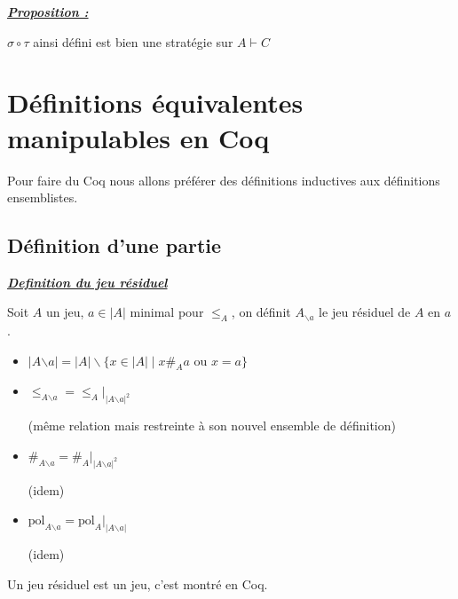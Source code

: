 \documentclass[a4paper,12ptCOUCOU
]{article}
\newlength{\mydepth}
\newlength{\myheight}
\newenvironment{answer}
{\par\begin{lrbox}{\mybox}\quad\begin{minipage}{\linewidth}\color{black}\setlength{\parskip}{10pt plus 1pt minus 1pt}\vspace*{-.7\baselineskip}}
{\end{minipage}\end{lrbox}
\settodepth{\mydepth}{\usebox{\mybox}}
\settoheight{\myheight}{\usebox{\mybox}}
\addtolength{\myheight}{\mydepth}
\noindent\makebox[0pt]{
  \color{gray}\hspace{-0pt}\rule[-\mydepth]{1pt}{\myheight}}
\usebox{\mybox}
  }
\begin{document}
\vspace{0.4cm}\begin{minipage}{\linewidth}\textbf{\textit{\underline{ Proposition : }}} \begin{answer}
$\sigma \circ \tau$ ainsi défini est bien une stratégie sur $A \vdash C$
\end{answer}\end{minipage}
\newpage
\section{Définitions équivalentes manipulables en Coq}

Pour faire du Coq nous allons préférer des définitions inductives aux
définitions ensemblistes.

\subsection{Définition d'une partie}

\vspace{0.4cm}\begin{minipage}{\linewidth}\textbf{\textit{\underline{ Definition du jeu résiduel }}} \begin{answer}
Soit $A$ un jeu, $a \in |A|$ minimal pour $\leq_A$, on définit
$A_{\backslash a}$ le jeu résiduel de $A$ en $a$.

\begin{itemize}
\item $|A{\backslash a}| = |A| \backslash \{x \in |A| \mid x \#_A a \text{ ou } x=a\}$
\item $\leq_{A{\backslash a}} = \leq_A|_{|A{\backslash a}|^2}$

(même relation mais restreinte à son nouvel ensemble de définition)

\item $\#_{A{\backslash a}} = \#_A|_{|A{\backslash a}|^2}$

(idem)

\item $\text{pol}_{A{\backslash a}} = \text{pol}_A|_{|A{\backslash a}|}$


(idem)


\end{itemize}

\end{answer}\end{minipage}

Un jeu résiduel est un jeu, c'est montré en Coq.
\end{document}
